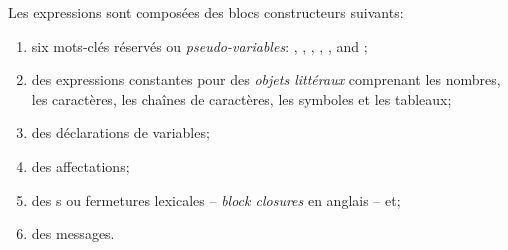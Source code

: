 \documentclass[a4paper,10pt,twoside]{book}
\begin{document}
Les expressions sont compos\'{e}es des blocs constructeurs suivants:
\begin{enumerate}[label=(\small\itshape\roman{*}), ref=(\small\itshape\roman{*})]
\item six mots-cl\'{e}s r\'{e}serv\'{e}s ou \emph{pseudo-variables}:
, , , , , and ;
\item des expressions constantes pour des \emph{objets littéraux} comprenant les nombres, les caract\`{e}res, les chaînes de caract\`{e}res, les symboles et les tableaux;
\item des d\'{e}clarations de variables;
\item des affectations;
\item des s ou fermetures lexicales -- \emph{block closures} en anglais -- et;
\item des messages.
\end{enumerate}
\end{document}
